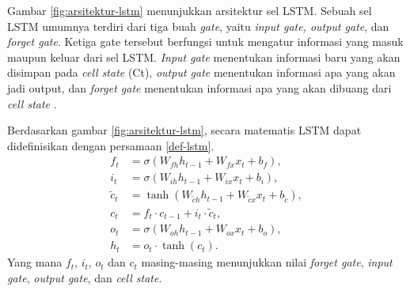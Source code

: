Gambar \ref{fig:arsitektur-lstm} menunjukkan arsitektur sel LSTM. Sebuah sel LSTM umumnya terdiri dari tiga buah \textit{gate}, yaitu \textit{input gate, output gate}, dan \textit{forget gate}. Ketiga gate tersebut berfungsi untuk mengatur informasi yang masuk maupun keluar dari sel LSTM.
\textit{Input gate} menentukan informasi baru yang akan disimpan pada \textit{cell state} (Ct), \textit{output gate} menentukan informasi apa yang akan jadi output, dan \textit{forget gate} menentukan informasi apa yang akan dibuang dari \textit{cell state} \parencite{yuReviewRecurrentNeural2019}.

Berdasarkan gambar \ref{fig:arsitektur-lstm}, secara matematis LSTM dapat didefinisikan dengan persamaan \ref{def-lstm}.
\begin{equation}
\begin{split}
    f_t &= \sigma (W_{fh}h_{t-1} + W_{fx}x_t + b_f), \\
    i_t &= \sigma (W_{ih}h_{t-1} + W_{ix}x_t + b_i),\\
    \tilde{c}_t &= \tanh (W_{\tilde{c}h}h_{t-1} + W_{\tilde{c}x}x_t + b_{\tilde{c}}), \\
    c_t &= f_t \cdot c_{t-1}+ i_t \cdot \tilde{c}_t,\\
    o_t &= \sigma (W_{oh}h_{t-1} + W_{ox}x_t + b_o), \\
    h_t &= o_t \cdot \tanh(c_t).
\end{split}
    \label{def-lstm}
\end{equation}
\noindent
Yang mana \(f_t\), \(i_t\), \(o_t\) dan \(c_t\) masing-masing menunjukkan nilai \emph{forget gate}, \emph{input gate}, \emph{output gate}, dan \emph{cell state}.

